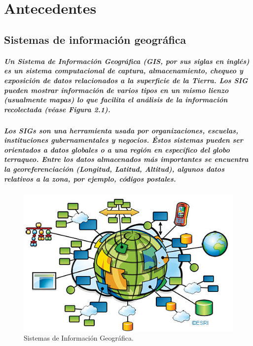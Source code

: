 \chapter {Antecedentes}
\section {Sistemas de información geográfica}
  \paragraph {Un Sistema de Información Geográfica (GIS, por sus siglas en inglés) es un sistema computacional de captura, almacenamiento, chequeo y exposición de datos relacionados a la superficie de la Tierra. Los SIG pueden mostrar información de varios tipos en un mismo lienzo (usualmente mapas) lo que facilita el análisis de la información recolectada (véase Figura 2.1).\cite{5}}

  \paragraph{Los SIGs son una herramienta usada por organizaciones, escuelas, instituciones gubernamentales y negocios. Éstos sistemas pueden ser orientados a datos globales o a una región en específico del globo terraqueo. Entre los datos almacenados más importantes se encuentra la georeferenciación (Longitud, Latitud, Altitud), algunos datos relativos a la zona, por ejemplo, códigos postales.}

  \begin{figure}[h!]
      \centering
        \includegraphics[width=\textwidth]{./images/GIS.jpg}
      \caption{Sistemas de Información Geográfica. \cite{18}}
  \end{figure}


